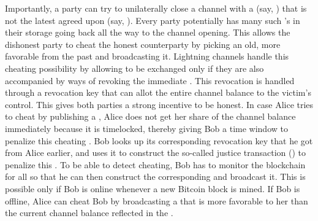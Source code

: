 Importantly, a party can try to unilaterally close a channel with a \ctx{} (say, \previousctx{}) that is not the latest agreed upon \ctx{} (say, \latestctx{}). Every party potentially has many such \previousctx{}'s in their storage going back all the way to the channel opening. This allows the dishonest party to cheat the honest counterparty by picking an old, more favorable \previousctx{} from the past and broadcasting it. Lightning channels handle this cheating possibility by allowing \latestctx{} to be exchanged only if they are also accompanied by ways of revoking the immediate \previousctx{}. This revocation is handled through a revocation key that can allot the entire channel balance to the victim's control. This gives both parties a strong incentive to be honest. In case Alice tries to cheat by publishing a \previousctx{}, Alice does not get her share of the channel balance immediately because it is timelocked, thereby giving Bob a time window to penalize this cheating \previousctx{}. Bob looks up its corresponding revocation key that he got from Alice earlier, and uses it to construct the so-called justice transaction (\jtx{}) to penalize this \previousctx{}. To be able to detect cheating, Bob has to monitor the blockchain for all \previousctx{} so that he can then construct the corresponding \jtx{} and broadcast it. This is possible only if Bob is online whenever a new Bitcoin block is mined. If Bob is offline, Alice can cheat Bob by broadcasting a \previousctx{} that is more favorable to her than the current channel balance reflected in the \latestctx{}. 

